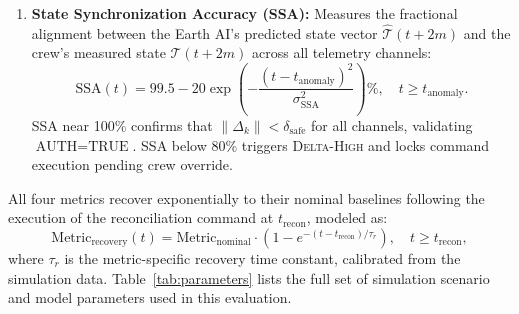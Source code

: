 \documentclass[ASNA,twocolumn]{USG}
\begin{document}
\begin{enumerate}
    \item \textbf{State Synchronization Accuracy (SSA):} Measures the fractional alignment
    between the Earth AI's predicted state vector \(\hat{\mathcal{T}}(t+2m)\) and the crew's
    measured state \(\mathcal{T}(t+2m)\) across all telemetry channels:
    \begin{equation}
        \text{SSA}(t) = 99.5 - 20 \exp\!\left(-\frac{(t - t_\text{anomaly})^2}{\sigma_\text{SSA}^2}\right)\%,
        \quad t \ge t_\text{anomaly}.
    \end{equation}
    SSA near 100\% confirms that \(\|\Delta_k\| < \delta_\text{safe}\) for all channels,
    validating \(\text{AUTH} = \text{TRUE}\). SSA below 80\% triggers \textsc{Delta-High}
    and locks command execution pending crew override.
\end{enumerate}

All four metrics recover exponentially to their nominal baselines following the execution
of the reconciliation command at \(t_\text{recon}\), modeled as:
\begin{equation}
  \text{Metric}_\text{recovery}(t) = \text{Metric}_\text{nominal}
    \cdot \left(1 - e^{-(t - t_\text{recon})/\tau_r}\right),
    \quad t \ge t_\text{recon},
\end{equation}
where \(\tau_r\) is the metric-specific recovery time constant, calibrated from the
simulation data. Table~\ref{tab:parameters} lists the full set of simulation scenario and model parameters used in this evaluation.
\end{document}
